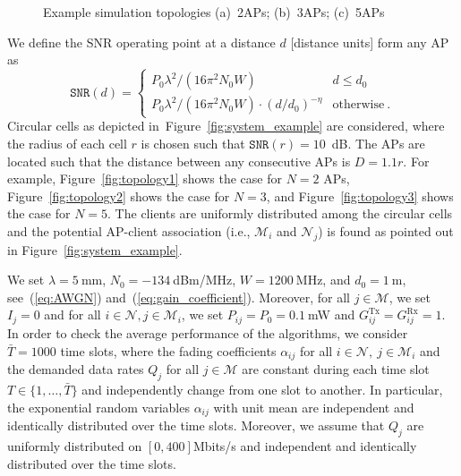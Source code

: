 \documentclass[journal, 10pt, twocolumn]{IEEEtran}
\begin{document}
\begin{figure}[t]
\centering
{}
\vspace{-2mm}
\caption{Example simulation topologies (a)~2APs; (b)~3APs; (c)~5APs}
\label{fig:topology_all}
\vspace{-0.4cm}
\end{figure}
We define the SNR operating point at a distance $d$ [distance units] form any AP as
\begin{equation} \label{eq:SNR}\nonumber
\texttt{SNR}(d) = \left\{ \begin{array}{ll}
  \displaystyle{{P}_{0}}\lambda^2/(16\pi^2N_0W) & d\leq d_0\\
 \displaystyle{{P}_{0}}\lambda^2/(16\pi^2N_0W)\cdot\left({d}/{d_0}\right)^{-\eta} &  \textrm{otherwise}\ .
\end{array} \right.
\end{equation}
Circular cells as depicted in~Figure~\ref{fig:system_example} are considered, where the radius of each cell $r$ is chosen such that $\texttt{SNR}(r)=10$~dB. The APs are located such that the distance between any consecutive APs is $D=1.1r$. For example, Figure~\ref{fig:topology1} shows the case for $N=2$ APs, Figure~\ref{fig:topology2} shows the case for $N=3$, and Figure~\ref{fig:topology3} shows the case for $N=5$. The clients are uniformly distributed among the circular cells and the potential AP-client association (i.e., $\mathcal{M}_i$ and $\mathcal{N}_j$) is found as pointed out in Figure~\ref{fig:system_example}.

We set $\lambda=5\:$mm, $N_0=-134\:$dBm/MHz, $W=1200\:$MHz, and $d_0=1\:$m, see~(\ref{eq:AWGN}) and~(\ref{eq:gain_coefficient}). Moreover, for all $j\in\mathcal{M}$, we set $I_j=0$ and for all $i\in\mathcal{N}, j\in\mathcal{M}_i$, we set $P_{ij}=P_0=0.1\:$mW and $G^{\mathrm{Tx}}_{ij}=G^{\mathrm{Rx}}_{ij}=1$. In order to check the average performance of the algorithms, we consider $\bar T=1000$ time slots, where the fading coefficients $\alpha_{ij}$ for all $i\in\mathcal{N}, \ j\in\mathcal{M}_i$ and the demanded data rates $Q_j$ for all $j\in\mathcal{M}$ are constant during each time slot $T\in\{1,\ldots,\bar{T}\}$ and independently change from one slot to another. In particular, the exponential random variables $\alpha_{ij}$ with unit mean are independent and identically distributed over the time slots. Moreover, we assume that $Q_j$ are uniformly distributed on $[0,400]$Mbits/s and independent and identically distributed over the time slots.
\end{document}
